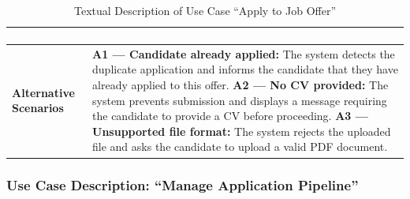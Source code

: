 \begin{table}[H]
\begin{tabularx}{\textwidth}{|>{\bfseries\arraybackslash}p{4cm}|X|}
\begin{enumerate}[leftmargin=*, label=\arabic*., topsep=0pt, itemsep=0pt]
\end{enumerate} \\
\hline
Alternative Scenarios &
\textbf{A1 --- Candidate already applied:} The system detects the duplicate application and informs the candidate that they have already applied to this offer. \newline
\textbf{A2 --- No CV provided:} The system prevents submission and displays a message requiring the candidate to provide a CV before proceeding. \newline
\textbf{A3 --- Unsupported file format:} The system rejects the uploaded file and asks the candidate to upload a valid PDF document. \\
\hline
\end{tabularx}
\caption{Textual Description of Use Case ``Apply to Job Offer''}
\label{tab:uc-applyoffer}
\end{table}
\normalsize
\setlength{\tabcolsep}{6pt}
\renewcommand{\arraystretch}{1}

\subsubsection{Use Case Description: ``Manage Application Pipeline''}

